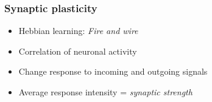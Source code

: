 \begin{frame}
\frametitle{Synaptic plasticity}
\begin{itemize}[<+(1)->]
\item Hebbian learning: \textsl{Fire and wire} \\
\item Correlation of neuronal activity \\
\item Change response to incoming and outgoing signals \\
\item Average response intensity = \textsl{synaptic strength} \\ 
\end{itemize}
\end{frame}





